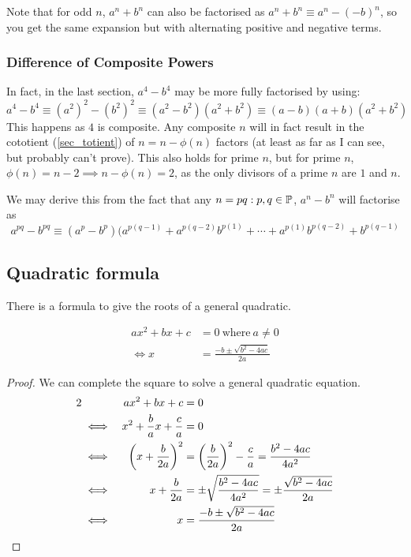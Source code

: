 Note that for odd \(n\), \(a^n + b^n\) can also be factorised as
\(a^n + b^n \equiv a^n - (-b)^n\), so you get the same expansion but with
alternating positive and negative terms.


\subsubsection{Difference of Composite Powers}

In fact, in the last section, \(a^4 - b^4\) may be more fully factorised by
using:
\begin{equation*}
a^4 - b^4 \equiv (a^2)^2 - (b^2)^2 \equiv (a^2 - b^2)(a^2 + b^2) \equiv
    (a - b)(a + b)(a^2 + b^2)
\end{equation*}
This happens as \(4\) is composite. Any composite \(n\) will in fact result
in the cototient (\ref{sec_totient}) of \(n = n - \phi(n)\) factors (at
least as far as I can see, but probably can't prove). This
also holds for prime \(n\), but for prime \(n\),
\(\phi(n) = n - 2 \implies n - \phi(n) = 2\), as the only divisors of
a prime \(n\) are \(1\) and \(n\).

We may derive this from the fact that any \(n = pq: p, q \in \mathbb P\),
\(a^n - b^n\) will factorise as
\begin{equation}
a^{pq} - b^{pq} \equiv
 (a^p - b^p)(a^{p(q - 1)} + a^{p(q - 2)}b^{p(1)} + \dotsb +
             a^{p(1)}b^{p(q - 2)} + b^{p(q - 1)}
\end{equation}

\subsection{Quadratic formula} \label{sec_quad_formula}

There is a formula to give the roots of a general quadratic.
\begin{theorem}
\begin{align*}
ax^2 + bx + c &= 0\ \text{where}\ a \neq 0 \\
\iff x &= \frac{-b \pm \sqrt{b^2 - 4ac}}{2a}
\end{align*}
\end{theorem}
\begin{proof}
We can complete the square to solve a general quadratic equation.
\begin{alignat*}2
&&ax^2 + bx + c &= 0 \\
&\iff& x^2 + \frac ba x + \frac ca &= 0 \\
&\iff& \pqty{x + \frac b{2a}}^2 &= \pqty{\frac b{2a}}^2 - \frac ca
    = \frac{b^2 - 4ac}{4a^2} \\
&\iff& x + \frac b{2a} &= \pm \sqrt{\frac{b^2 - 4ac}{4a^2}}
    = \pm \frac{\sqrt{b^2 - 4ac}}{2a} \\
&\iff& x &= \frac{-b \pm \sqrt{b^2 - 4ac}}{2a} \tag*{\qedhere}
\end{alignat*}
\end{proof}

